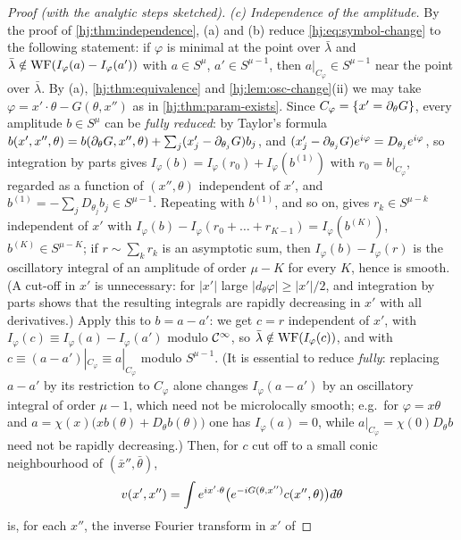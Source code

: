 \begin{proof}[Proof (with the analytic steps sketched)]
  \emph{(c) Independence of the amplitude.}  By the proof of
  \cref{hj:thm:independence}, (a) and (b) reduce \eqref{hj:eq:symbol-change} to
  the following statement: if $\varphi$ is minimal at the point over
  $\bar\lambda$ and $\bar\lambda\notin\operatorname{WF}(I_\varphi(a)-I_\varphi(a'))$ with
  $a\in S^\mu$, $a'\in S^{\mu-1}$, then $a|_{C_\varphi}\in S^{\mu-1}$ near the
  point over $\bar\lambda$.  By (a), \cref{hj:thm:equivalence} and
  \cref{hj:lem:osc-change}(ii) we may take $\varphi=x'\cdot\theta-G(\theta,x'')$
  as in \cref{hj:thm:param-exists}.  Since $C_\varphi=\{x'=\partial_\theta G\}$, every
  amplitude $b\in S^\mu$ can be \emph{fully reduced}: by Taylor's formula
  $b(x',x'',\theta)=b(\partial_\theta G,x'',\theta)+\sum_j(x'_j-\partial_{\theta_j}G)b_j$, and
  $(x'_j-\partial_{\theta_j}G)e^{i\varphi}=D_{\theta_j}e^{i\varphi}$, so integration by parts
  gives $I_\varphi(b)=I_\varphi(r_0)+I_\varphi(b^{(1)})$ with $r_0=b|_{C_\varphi}$,
  regarded as a function of $(x'',\theta)$ independent of $x'$, and
  $b^{(1)}=-\sum_jD_{\theta_j}b_j\in S^{\mu-1}$.  Repeating with $b^{(1)}$, and so on,
  gives $r_k\in S^{\mu-k}$ independent of $x'$ with $I_\varphi(b)-I_\varphi(r_0+\dots+
  r_{K-1})=I_\varphi(b^{(K)})$, $b^{(K)}\in S^{\mu-K}$; if $r\sim\sum_kr_k$ is an
  asymptotic sum, then $I_\varphi(b)-I_\varphi(r)$ is the oscillatory integral of an
  amplitude of order $\mu-K$ for every $K$, hence is smooth.  (A cut-off in $x'$ is
  unnecessary: for $|x'|$ large $|d_\theta\varphi|\ge|x'|/2$, and integration by parts
  shows that the resulting integrals are rapidly decreasing in $x'$ with all
  derivatives.)  Apply this to $b=a-a'$: we get $c=r$ independent of $x'$, with
  $I_\varphi(c)\equiv I_\varphi(a)-I_\varphi(a')$ modulo $\mathcal{C}^\infty$, so
  $\bar\lambda\notin\operatorname{WF}(I_\varphi(c))$, and with
  $c\equiv(a-a')|_{C_\varphi}\equiv a|_{C_\varphi}$ modulo $S^{\mu-1}$.  (It is
  essential to reduce \emph{fully}: replacing $a-a'$ by its restriction to $C_\varphi$
  alone changes $I_\varphi(a-a')$ by an oscillatory integral of order $\mu-1$, which
  need not be microlocally smooth; e.g.\ for $\varphi=x\theta$ and $a=\chi(x)\big(x
  b(\theta)+D_\theta b(\theta)\big)$ one has $I_\varphi(a)=0$, while $a|_{C_\varphi}=
  \chi(0)D_\theta b$ need not be rapidly decreasing.)
  Then, for $c$ cut off to a small conic neighbourhood of
  $(\bar x'',\bar\theta)$,
  \begin{equation*}
    v(x',x'')=\int e^{ix'\cdot\theta}\big(e^{-iG(\theta,x'')}c(x'',\theta)\big)\,\dbar\theta
  \end{equation*}
  is, for each $x''$, the inverse Fourier transform in $x'$ of

\end{proof}
